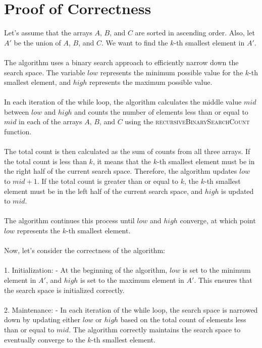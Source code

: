 \documentclass{article}
\begin{document}
\section{Proof of Correctness}
Let's assume that the arrays $A$, $B$, and $C$ are sorted in ascending order. Also, let $A'$ be the union of $A$, $B$, and $C$. We want to find the $k$-th smallest element in $A'$.
\\\\
The algorithm uses a binary search approach to efficiently narrow down the search space. The variable $low$ represents the minimum possible value for the $k$-th smallest element, and $high$ represents the maximum possible value.
\\\\
In each iteration of the while loop, the algorithm calculates the middle value $mid$ between $low$ and $high$ and counts the number of elements less than or equal to $mid$ in each of the arrays $A$, $B$, and $C$ using the \textsc{recursiveBinarySearchCount} function.
\\\\
The total count is then calculated as the sum of counts from all three arrays. If the total count is less than $k$, it means that the $k$-th smallest element must be in the right half of the current search space. Therefore, the algorithm updates $low$ to $mid + 1$. If the total count is greater than or equal to $k$, the $k$-th smallest element must be in the left half of the current search space, and $high$ is updated to $mid$.
\\\\
The algorithm continues this process until $low$ and $high$ converge, at which point $low$ represents the $k$-th smallest element.
\\\\
Now, let's consider the correctness of the algorithm:
\\\\
1. Initialization:
   - At the beginning of the algorithm, $low$ is set to the minimum element in $A'$, and $high$ is set to the maximum element in $A'$. This ensures that the search space is initialized correctly.
\\\\
2. Maintenance:
   - In each iteration of the while loop, the search space is narrowed down by updating either $low$ or $high$ based on the total count of elements less than or equal to $mid$. The algorithm correctly maintains the search space to eventually converge to the $k$-th smallest element.
\\\\
\end{document}
